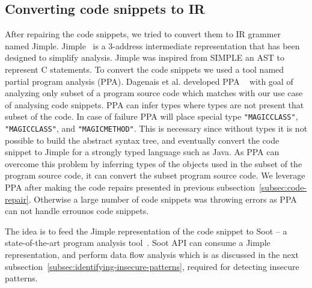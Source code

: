 \subsection{Converting code snippets to IR}
\label{subsec:converting-to-IR}

After repairing the code snippets, we tried to convert them to IR grammer named Jimple. Jimple~\cite{vallee1998jimple} is a 3-address intermediate representation that has been designed to simplify analysis. Jimple was inspired from SIMPLE an AST to represent C statements. To convert the code snippets we used a tool named partial program analysis (PPA). Dagenais et al. developed PPA ~\cite{dagenais2008enabling} with goal of analyzing only subset of a program source code which matches with our use case of analysing code snippets. PPA  can infer types where types are not present that subset of the code. In case of failure PPA will place special type \texttt{"MAGICCLASS"}, \texttt{"MAGICCLASS"}, and \texttt{"MAGICMETHOD"}. This is necessary since without types it is not possible to build the abstract syntax tree, and eventually convert the code snippet to Jimple for a strongly typed language such as Java. As PPA can overcome this problem by inferring types of the objects used in the subset of the program source code, it can convert the subset program source code. We leverage PPA after making the code repairs presented in previous subsection~\ref{subsec:code-repair}. Otherwise a large number of code snippets was throwing errors as PPA can not handle errounos code snippets.     

The idea is to feed the Jimple representation of the code snippet to Soot -- a state-of-the-art program analysis tool~\cite{soot}. Soot API can consume a Jimple representation, and perform data flow analysis which is as discussed in the next subsection~\ref{subsec:identifying-insecure-patterns}, required for detecting insecure patterns.

